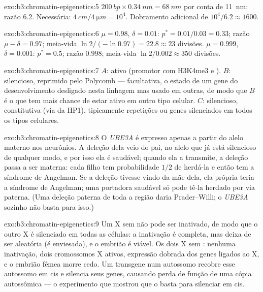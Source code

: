 \begin{solution}{exo:b3:chromatin-epigenetics:5}
$\qty{200}{bp}\times \qty{0.34}{nm} = \qty{68}{nm}$ por conta de
\qty{11}{nm}: razão $6.2$. Necessária: $\qty{4}{cm}/\qty{4}{\micro m} =
10^{4}$. Dobramento adicional de $10^{4}/6.2 \approx 1600$.
\end{solution}

\begin{solution}{exo:b3:chromatin-epigenetics:6}
$\mu = 0.98$, $\delta = 0.01$: $p^{*} = 0.01/0.03 = 0.33$; razão $\mu -
\delta = 0.97$; meia-vida $\ln 2/(-\ln 0.97) = 22.8 \approx 23$
divisões. $\mu = 0.999$, $\delta = 0.001$: $p^{*} = 0.5$; razão
$0.998$; meia-vida $\ln 2 / 0.002 \approx 350$ divisões.
\end{solution}

\begin{solution}{exo:b3:chromatin-epigenetics:7}
$A$: ativo (promotor com H3K4me3 e ). $B$: silencioso,
reprimido pelo Polycomb ---  facultativa, o estado de um
gene do desenvolvimento desligado nesta linhagem mas usado em outras,
de modo que $B$ é o que tem mais chance de estar ativo em outro tipo
celular. $C$: silencioso,  constitutiva (via da HP1),
tipicamente repetições ou genes silenciados em todos os tipos
celulares.
\end{solution}

\begin{solution}{exo:b3:chromatin-epigenetics:8}
O \emph{UBE3A} é expresso apenas a partir do alelo materno nos
neurônios. A deleção dela veio do pai, no alelo que já está silencioso
de qualquer modo, e por isso ela é saudável; quando ela a transmite, a
deleção passa a ser materna: cada filho tem probabilidade $1/2$ de
herdá-la e então tem a síndrome de Angelman. Se a deleção tivesse vindo
da mãe dela, ela própria teria a síndrome de Angelman; uma portadora
saudável só pode tê-la herdado por via paterna. (Uma deleção paterna de
toda a região daria Prader--Willi; o \emph{UBE3A} sozinho não basta
para isso.)
\end{solution}

\begin{solution}{exo:b3:chromatin-epigenetics:9}
Um X sem \emph{} não pode ser inativado, de modo que o outro X é
silenciado em todas as células: a inativação é completa, mas deixa de
ser aleatória (é enviesada), e o embrião é viável. Os dois X sem
\emph{}: nenhuma inativação, dois cromossomos X ativos, expressão
dobrada dos genes ligados ao X, e o embrião fêmea morre cedo. Um
transgene \emph{} num autossomo recobre esse autossomo em cis e
silencia seus genes, causando perda de função de uma cópia autossômica
--- o experimento que mostrou que o \emph{} basta para silenciar
em cis.
\end{solution}

